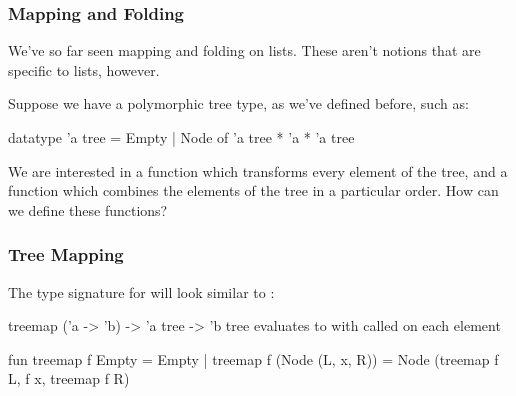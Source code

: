 \documentclass[aspectratio=169]{beamer}
\begin{document}

\begin{frame}[fragile]
  \frametitle{Mapping and Folding}
  
  \tgs

  We've so far seen mapping and folding on lists. These aren't notions that are 
  specific to lists, however\footnotemark.

  \pause
  \vspace{\fill}

  Suppose we have a polymorphic tree type, as we've defined before, such as:
  \begin{codeblock}
    datatype 'a tree = Empty | Node of 'a tree * 'a * 'a tree
  \end{codeblock}

  \pause
  \vspace{\fill}

  We are interested in a  function which transforms every element of the
  tree, and a  function which combines the elements of the tree in a 
  particular order. How can we define these functions?

\end{frame}

\begin{frame}[fragile]
  \frametitle{Tree Mapping}

  The type signature for  will look similar to :

  \pause
  \vspace{\fill}

  \spec
    {treemap}
    {('a -> 'b) -> 'a tree -> 'b tree}
    {}
    { evaluates to  with  called on
    each element}

  \pause
  \vspace{\fill}

  \begin{codeblock}
    fun treemap f Empty = Empty
      | treemap f (Node (L, x, R)) = 
          Node (treemap f L, f x, treemap f R)
  \end{codeblock}
\end{frame}
\end{document}
